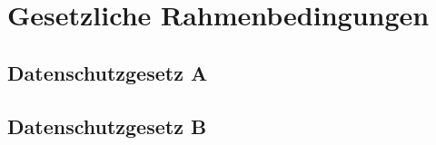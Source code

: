 \chapter{Gesetzliche Rahmenbedingungen}

\section{Datenschutzgesetz A}

\section{Datenschutzgesetz B}